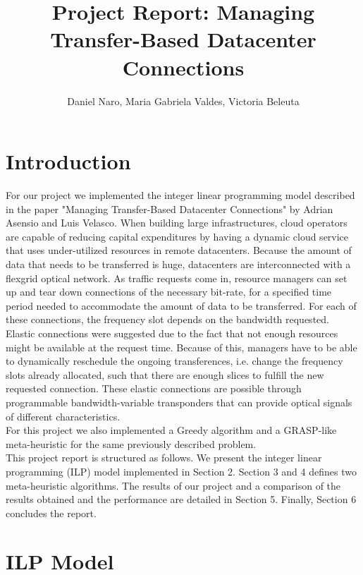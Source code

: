 \documentclass[11pt,a4paper]{article}
\title{Project Report: Managing Transfer-Based Datacenter Connections}
\author{Daniel Naro, Maria Gabriela Valdes, Victoria Beleuta}
\begin{document}
\maketitle
\section{Introduction}

For our project we implemented the integer linear programming model described in the paper "Managing Transfer-Based Datacenter Connections" by Adrian Asensio and Luis Velasco. When building large infrastructures, cloud operators are capable of reducing capital expenditures by having a dynamic cloud service that uses under-utilized resources in remote datacenters. Because the amount of data that needs to be transferred is huge, datacenters are interconnected with a flexgrid optical network. As traffic requests come in, resource managers can set up and tear down connections of the necessary bit-rate, for a specified time period needed to accommodate the amount of data to be transferred. For each of these connections, the frequency slot depends on the bandwidth requested.  Elastic connections were suggested due to the fact that not enough resources might be available at the request time. Because of this, managers have to be able to dynamically reschedule the ongoing transferences, i.e. change the frequency slots already allocated, such that there are enough slices to fulfill the new requested connection. These elastic connections are possible through programmable bandwidth-variable transponders that can provide optical signals of different characteristics.\\

For this project we also implemented a Greedy algorithm and a GRASP-like meta-heuristic for the same previously described problem.\\

This project report is structured as follows. We present the integer linear programming (ILP) model implemented in Section 2. Section 3 and 4 defines two meta-heuristic algorithms. The results of our project and a comparison of the results obtained and the performance are detailed in Section 5. Finally, Section 6 concludes the report.

\section{ILP Model}
\end{document}
